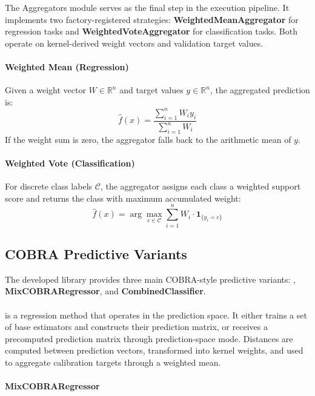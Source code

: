 \hs The Aggregators module serves as the final step in the execution pipeline. It implements two factory-registered strategies: \textbf{WeightedMeanAggregator} for regression tasks and \textbf{WeightedVoteAggregator} for classification tasks. Both operate on kernel-derived weight vectors and validation target values.

\paragraph{Weighted Mean (Regression)}
Given a weight vector $W \in \mathbb{R}^n$ and target values $y \in \mathbb{R}^n$, the aggregated prediction is:
\[
    \hat{f}(x) = \frac{\sum_{i=1}^n W_i y_i}{\sum_{i=1}^n W_i}
\]
If the weight sum is zero, the aggregator falls back to the arithmetic mean of $y$.

\paragraph{Weighted Vote (Classification)}
For discrete class labels $\mathcal{C}$, the aggregator assigns each class a weighted support score and returns the class with maximum accumulated weight:
\[
    \hat{f}(x) = \arg\max_{c \in \mathcal{C}} \sum_{i=1}^n W_i \cdot \mathbf{1}_{\{y_i = c\}}
\]

\subsection{COBRA Predictive Variants}
\label{subsec:cobra_predictive_variants}

\hs The developed library provides three main COBRA-style predictive variants: \GradientCOBRA{}, \textbf{MixCOBRARegressor}, and \textbf{CombinedClassifier}.

\paragraph{\GradientCOBRA{}}

\GradientCOBRA{} is a regression method that operates in the prediction space. It either trains a set of base estimators and constructs their prediction matrix, or receives a precomputed prediction matrix through prediction-space mode. Distances are computed between prediction vectors, transformed into kernel weights, and used to aggregate calibration targets through a weighted mean.

\paragraph{\textbf{MixCOBRARegressor}}


